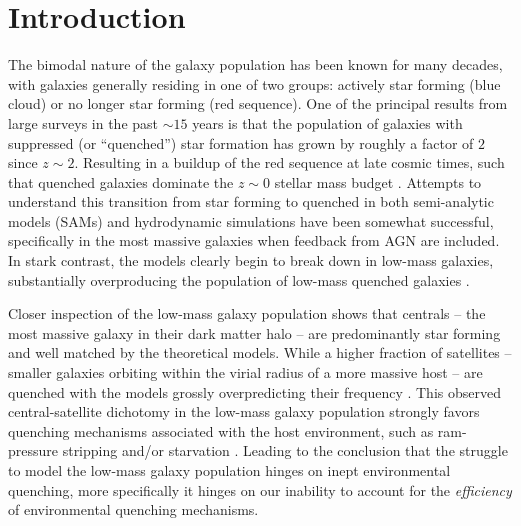 \newcommand{\vcirc}{v_{\rm{circ}}}
\newcommand{\vmax}{V_{\rm{max}}}
\newcommand{\rmax}{R_{\rm{max}}}
\newcommand{\mhalf}{M_{1/2}}
\newcommand{\rhalf}{R_{1/2}}
\newcommand{\mmax}{M_{\rm max}}
\newcommand{\msub}{M_{\rm{sub}}}
\newcommand{\mvir}{M_{\rm{vir}}}
\newcommand{\mhalo}{{M}_{\rm{halo}}}
\newcommand{\mpeak}{{M}_{\rm{peak}}}
\newcommand{\rvir}{R_{\rm{vir}}}
\newcommand{\vvir}{V_{\rm{vir}}}
\newcommand{\dd}{{\rm d}}
\newcommand{\mstar}{{\rm M}_{\star}}
\newcommand{\lstar}{L^{*}}
\newcommand{\msun}{{\rm M}_{\odot}}
\newcommand{\lsun}{L_{\odot}}
\newcommand{\mpc}{{\rm Mpc}}
\newcommand{\kpc}{{\rm kpc}}
\newcommand{\kms}{{\rm km \, s}^{-1}}
\newcommand{\millen}{MS-I}
\newcommand{\msii}{MS-II}
\newcommand{\lcdm}{$\Lambda$CDM}
\newcommand{\diso}{d_{\rm iso}}
\newcommand{\niso}{n_{\rm iso}}
\newcommand{\lt}{<}
\newcommand{\gt}{>}

\chapter{Introduction}


The bimodal nature of the galaxy population has been known for many
decades, with galaxies generally residing in one of two groups:
actively star forming (blue cloud) or no longer star forming (red
sequence).  
%
One of the principal results from large surveys in the past $\sim 15$
years is that the population of galaxies with suppressed (or
``quenched'') star formation has grown by roughly a factor of $2$
since $z \sim 2$. 
Resulting in a buildup of the red sequence at late cosmic times, such
that quenched galaxies dominate the $z \sim 0$ stellar mass budget
\citep{faber07}.  
%
Attempts to understand this transition from star forming to quenched
in both semi-analytic models (SAMs) and hydrodynamic simulations have
been somewhat successful, specifically in the most massive galaxies when
feedback from AGN are included.
%
In stark contrast, the models clearly begin to break down in low-mass
galaxies, substantially overproducing the population of low-mass
quenched galaxies \citep{kimm09}. 



Closer inspection of the low-mass galaxy population shows that
centrals -- the most massive galaxy in their dark matter halo -- are
predominantly star forming and well matched by the theoretical models.
%
While a higher fraction of satellites -- smaller galaxies orbiting
within the virial radius of a more massive host -- are quenched with
the models grossly overpredicting their frequency \citep{geha12,
  hirschmann14}. 
%
This observed central-satellite dichotomy in the 
low-mass galaxy population strongly favors quenching
mechanisms associated with the host environment, such as ram-pressure
stripping \citep[RPS,][]{gunn72} and/or starvation \citep{larson80}.
%
Leading to the conclusion that the struggle to model the low-mass
galaxy population hinges on inept environmental quenching,
more specifically it hinges on our inability to account for the
\emph{efficiency} of environmental quenching mechanisms.
%



